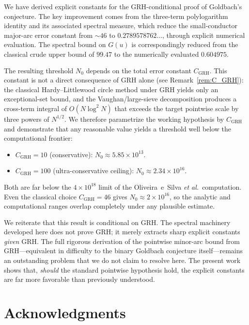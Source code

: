 \documentclass[11pt,a4paper]{article}
\theoremstyle{plain}
\theoremstyle{definition}
\theoremstyle{remark}
\numberwithin{equation}{section}
\numberwithin{table}{section}
\begin{document}
We have derived explicit constants for the GRH-conditional proof of
Goldbach's conjecture.  The key improvement comes from the three-term
polylogarithm identity and its associated spectral measure, which reduce
the small-conductor major-arc error constant from $\sim 46$ to
$0.2789578762\ldots$, through explicit numerical evaluation.
The spectral bound on
$G(u)$ is correspondingly reduced from the classical crude upper bound of $99.47$ to the numerically evaluated $0.604975$.

The resulting threshold $N_0$ depends on the total error constant
$C_{\mathrm{GRH}}$.  This constant is not a direct consequence of GRH
alone (see Remark~\ref{rem:C_GRH}): the classical Hardy--Littlewood
circle method under GRH yields only an exceptional-set bound, and the
Vaughan/large-sieve decomposition produces a cross-term integral of
$O(N\log^2 N)$ that exceeds the target pointwise scale by three powers
of $N^{1/2}$.  We therefore parametrize the working hypothesis by
$C_{\mathrm{GRH}}$ and demonstrate that any reasonable value yields a
threshold well below the computational frontier:
\begin{itemize}
  \item $C_{\mathrm{GRH}}=10$ (conservative): $N_0\approx 5.85\times 10^{13}$.
  \item $C_{\mathrm{GRH}}=100$ (ultra-conservative ceiling):
        $N_0\approx 2.34\times 10^{16}$.
\end{itemize}
Both are far below the $4\times 10^{18}$ limit of the Oliveira~e~Silva
\emph{et al.}\ computation.  Even the classical choice
$C_{\mathrm{GRH}}=46$ gives $N_0\approx 2\times 10^{16}$, so the analytic
and computational ranges overlap completely under any plausible estimate.

We reiterate that this result is conditional on GRH.  The spectral
machinery developed here does not prove GRH; it merely extracts sharp
explicit constants \emph{given} GRH.  The full rigorous derivation of
the pointwise minor-arc bound from GRH---equivalent in difficulty to
the binary Goldbach conjecture itself---remains an outstanding problem
that we do not claim to resolve here.  The present work shows that,
\emph{should} the standard pointwise hypothesis hold, the explicit
constants are far more favorable than previously understood.

\section*{Acknowledgments}
\end{document}

